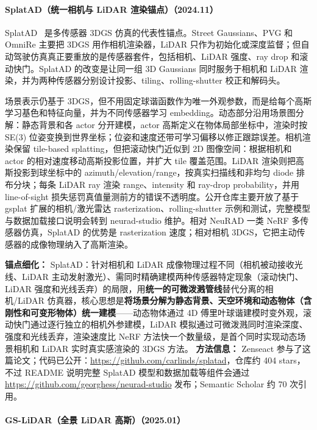 \paragraph{SplatAD（统一相机与 LiDAR 渲染锚点）（2024.11）}
SplatAD~\cite{2411_16816} 是多传感器 3DGS 仿真的代表性锚点。Street Gaussians、PVG 和 OmniRe 主要把 3DGS 用作相机渲染器，LiDAR 只作为初始化或深度监督；但自动驾驶仿真真正要重放的是传感器套件，包括相机、LiDAR 强度、ray drop 和滚动快门。SplatAD 的改变是让同一组 3D Gaussians 同时服务于相机和 LiDAR 渲染，并为两种传感器分别设计投影、tiling、rolling-shutter 校正和解码头。

场景表示仍基于 3DGS，但不用固定球谐函数作为唯一外观参数，而是给每个高斯学习基色和特征向量，并为不同传感器学习 embedding。动态部分沿用场景图分解：静态背景和各 actor 分开建模，actor 高斯定义在物体局部坐标中，渲染时按 SE(3) 位姿变换到世界坐标；位姿和速度还带可学习偏移以修正跟踪误差。相机渲染保留 tile-based splatting，但把滚动快门近似到 2D 图像空间：根据相机和 actor 的相对速度移动高斯投影位置，并扩大 tile 覆盖范围。LiDAR 渲染则把高斯投影到球坐标中的 azimuth/elevation/range，按真实扫描线和非均匀 diode 排布分块；每条 LiDAR ray 渲染 range、intensity 和 ray-drop probability，并用 line-of-sight 损失惩罚真值量测前方的错误不透明度。公开仓库主要开放了基于 gsplat 扩展的相机/激光雷达 rasterization、rolling-shutter 示例和测试，完整模型与数据加载接口说明会转到 neurad-studio 维护。相对 NeuRAD 一类 NeRF 多传感器仿真，SplatAD 的优势是 rasterization 速度；相对相机 3DGS，它把主动传感器的成像物理纳入了高斯渲染。

\textbf{锚点细化：} SplatAD：针对相机和 LiDAR 成像物理过程不同（相机被动接收光线、LiDAR 主动发射激光）、需同时精确建模两种传感器特定现象（滚动快门、LiDAR 强度和光线丢弃）的局限，用\textbf{统一的可微泼溅管线}替代分离的相机/LiDAR 仿真器，核心思想是\textbf{将场景分解为静态背景、天空环境和动态物体（含刚性和可变形物体）统一建模}——动态物体通过 4D 傅里叶球谐建模时变外观，滚动快门通过逐行独立的相机外参建模，LiDAR 模拟通过可微泼溅同时渲染深度、强度和光线丢弃，渲染速度比 NeRF 方法快一个数量级，是首个同时实现动态场景相机和 LiDAR 实时真实感渲染的 3DGS 方法。
\textbf{方法信息：} Zenseact 参与了这篇论文；代码已公开：\url{https://github.com/carlinds/splatad}，仓库约 404 stars，不过 README 说明完整 SplatAD 模型和数据加载等组件会通过 \url{https://github.com/georghess/neurad-studio} 发布；Semantic Scholar 约 70 次引用。



\paragraph{GS-LiDAR（全景 LiDAR 高斯）（2025.01）}

